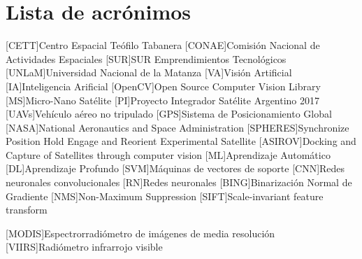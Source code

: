 \chapter*{Lista de acrónimos}
\label{chap:acronimos}

\begin{acronym}[SAOCOM]
[CETT]{Centro Espacial Teófilo Tabanera}
[CONAE]{Comisión Nacional de Actividades Espaciales}
[SUR]{SUR Emprendimientos Tecnológicos}
[UNLaM]{Universidad Nacional de la Matanza}
[VA]{Visión Artificial}
[IA]{Inteligencia Arificial}
[OpenCV]{Open Source Computer Vision Library}
[MS]{Micro-Nano Satélite}
[PI]{Proyecto Integrador Satélite Argentino 2017}
[UAVs]{Vehículo aéreo no tripulado}
[GPS]{Sistema de Posicionamiento Global}
[NASA]{National Aeronautics and Space Administration}
[SPHERES]{Synchronize Position Hold Engage and Reorient Experimental Satellite}
 [ASIROV]{Docking and Capture of Satellites through computer vision}
[ML]{Aprendizaje Automático}
[DL]{Aprendizaje Profundo}
[SVM]{Máquinas de vectores de soporte}
[CNN]{Redes neuronales convolucionales}
[RN]{Redes neuronales}
[BING]{Binarización Normal de Gradiente}
[NMS]{Non-Maximum Suppression}
[SIFT]{Scale-invariant feature transform}

[MODIS]{Espectrorradiómetro de imágenes de media resolución}
[VIIRS]{Radiómetro infrarrojo visible}
\end{acronym}


